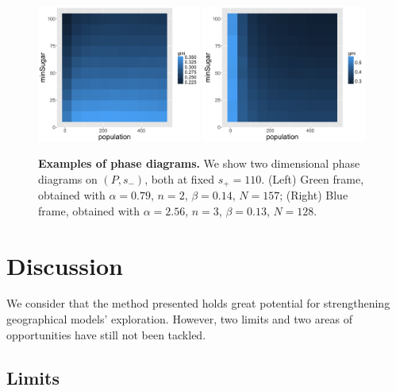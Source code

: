 \documentclass[3p,times,procedia]{elsarticle}
\begin{document}
\begin{figure}
\centering
\includegraphics[width=0.48\textwidth]{figures/phasediagram_id27_maxSugar110}
\includegraphics[width=0.48\textwidth]{figures/phasediagram_id0_maxSugar110}
\caption{\textbf{Examples of phase diagrams.} We show two dimensional phase diagrams on $(P,s_-)$, both at fixed $s_+ = 110$. (Left) Green frame, obtained with $\alpha = 0.79$, $n=2$, $\beta = 0.14$, $N=157$; (Right) Blue frame, obtained with $\alpha = 2.56$, $n=3$, $\beta = 0.13$, $N=128$.}
\label{fig:sugarscape-phasediagrams}
\end{figure}


\section{Discussion}

We consider that the method presented  holds great potential for strengthening geographical models' exploration. However, two limits and two areas of opportunities have still not been tackled. 

\subsection{Limits}
\end{document}
